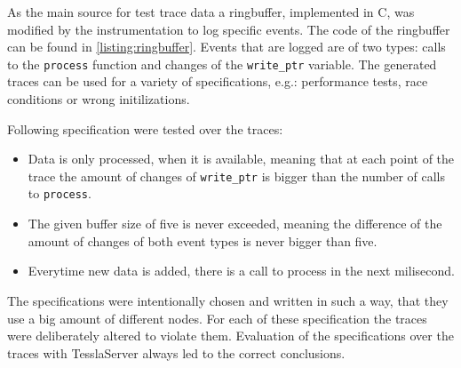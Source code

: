
As the main source for test trace data a ringbuffer, implemented in C, was modified by the instrumentation to log specific events.
The code of the ringbuffer can be found in \cref{listing:ringbuffer}.
Events that are logged are of two types: calls to the \lstinline{process} function and changes of the \lstinline{write_ptr} variable.
The generated traces can be used for a variety of specifications, e.g.: performance tests, race conditions or wrong initilizations.

Following specification were tested over the traces:

\begin{itemize}
  \item Data is only processed, when it is available, meaning that at each point of the trace the amount of changes of \lstinline{write_ptr} is bigger than the number of calls to \lstinline{process}.
  \item The given buffer size of five is never exceeded, meaning the difference of the amount of changes of both event types is never bigger than five.
  \item Everytime new data is added, there is a call to process in the next milisecond.
\end{itemize}

The specifications were intentionally chosen and written in such a way, that they use a big amount of different nodes.
For each of these specification the traces were deliberately altered to violate them.
Evaluation of the specifications over the traces with TesslaServer always led to the correct conclusions.
